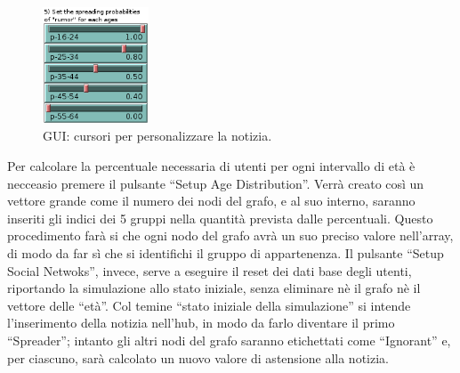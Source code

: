 \begin{figure}
  \vspace*{-35pt}
  \begin{center}
    \includegraphics[width=0.28\textwidth]{img/gui-news.png}
  \end{center}
 \vspace*{-10pt}
 \caption{GUI: cursori per personalizzare la notizia.}
 \vspace*{-10pt}
 \label{img:gui_news}
\end{figure}
Per calcolare la percentuale necessaria di utenti per ogni intervallo di età è necceasio premere il pulsante ``Setup Age Distribution''.
Verrà creato così un vettore grande come il numero dei nodi del grafo, e al suo interno, saranno inseriti gli indici dei 5 gruppi nella 
quantità prevista dalle percentuali. 
Questo procedimento farà si che ogni nodo del grafo avrà un suo preciso valore nell'array, 
di modo da far sì che si identifichi il gruppo di appartenenza.
Il pulsante ``Setup Social Netwoks'', invece, serve a eseguire il reset dei dati base degli utenti, riportando la simulazione 
allo stato iniziale, senza eliminare nè il grafo nè il vettore delle ``età''.
Col temine ``stato iniziale della simulazione'' si intende l'inserimento della notizia nell'hub, in modo da farlo 
diventare il primo ``Spreader''; intanto gli altri nodi del grafo saranno etichettati come 
``Ignorant'' e, per ciascuno, sarà calcolato un nuovo valore di astensione alla notizia.

